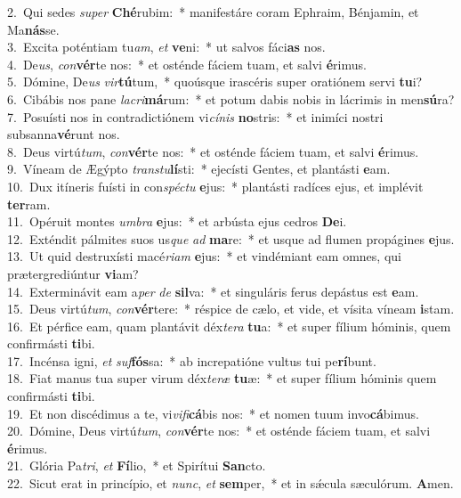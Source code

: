 {2.~}Qui sedes \textit{su}\textit{per} \textbf{Ché}rubim:~* manifestáre coram Ephraim, Bénjamin, et Ma\textbf{nás}se.\\
{3.~}Excita poténtiam tu\textit{am}, \textit{et} \textbf{ve}ni:~* ut salvos fáci\textbf{as} nos.\\
{4.~}De\textit{us}, \textit{con}\textbf{vér}te nos:~* et osténde fáciem tuam, et salvi \textbf{é}rimus.\\
{5.~}Dómine, De\textit{us} \textit{vir}\textbf{tú}tum,~* quoúsque irascéris super oratiónem servi \textbf{tu}i?\\
{6.~}Cibábis nos pane \textit{la}\textit{cri}\textbf{má}rum:~* et potum dabis nobis in lácrimis in men\textbf{sú}ra?\\
{7.~}Posuísti nos in contradictiónem vi\textit{cí}\textit{nis} \textbf{no}stris:~* et inimíci nostri subsanna\textbf{vé}runt nos.\\
{8.~}Deus virtú\textit{tum}, \textit{con}\textbf{vér}te nos:~* et osténde fáciem tuam, et salvi \textbf{é}rimus.\\
{9.~}Víneam de Ægýpto \textit{tran}\textit{stu}\textbf{lí}sti:~* ejecísti Gentes, et plantásti \textbf{e}am.\\
{10.~}Dux itíneris fuísti in con\textit{spé}\textit{ctu} \textbf{e}jus:~* plantásti radíces ejus, et implévit \textbf{ter}ram.\\
{11.~}Opéruit montes \textit{um}\textit{bra} \textbf{e}jus:~* et arbústa ejus cedros \textbf{De}i.\\
{12.~}Exténdit pálmites suos us\textit{que} \textit{ad} \textbf{ma}re:~* et usque ad flumen propágines \textbf{e}jus.\\
{13.~}Ut quid destruxísti macé\textit{ri}\textit{am} \textbf{e}jus:~* et vindémiant eam omnes, qui prætergrediúntur \textbf{vi}am?\\
{14.~}Exterminávit eam a\textit{per} \textit{de} \textbf{sil}va:~* et singuláris ferus depástus est \textbf{e}am.\\
{15.~}Deus virtú\textit{tum}, \textit{con}\textbf{vér}tere:~* réspice de cælo, et vide, et vísita víneam \textbf{i}stam.\\
{16.~}Et pérfice eam, quam plantávit déx\textit{te}\textit{ra} \textbf{tu}a:~* et super fílium hóminis, quem confirmásti \textbf{ti}bi.\\
{17.~}Incénsa igni, \textit{et} \textit{suf}\textbf{fós}sa:~* ab increpatióne vultus tui pe\textbf{rí}bunt.\\
{18.~}Fiat manus tua super virum déx\textit{te}\textit{ræ} \textbf{tu}æ:~* et super fílium hóminis quem confirmásti \textbf{ti}bi.\\
{19.~}Et non discédimus a te, vi\textit{vi}\textit{fi}\textbf{cá}bis nos:~* et nomen tuum invo\textbf{cá}bimus.\\
{20.~}Dómine, Deus virtú\textit{tum}, \textit{con}\textbf{vér}te nos:~* et osténde fáciem tuam, et salvi \textbf{é}rimus.\\
{21.~}Glória Pa\textit{tri}, \textit{et} \textbf{Fí}lio,~* et Spirítui \textbf{San}cto.\\
{22.~}Sicut erat in princípio, et \textit{nunc}, \textit{et} \textbf{sem}per,~* et in sǽcula sæculórum. \textbf{A}men.\\
